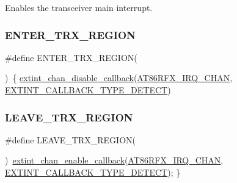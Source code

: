 Enables the transceiver main interrupt. \mbox{\label{group__samd21__xplained__pro__group_ga03364b3677b884617c15b752d8339e18}} 
\subsubsection{\texorpdfstring{ENTER\_TRX\_REGION}{ENTER\_TRX\_REGION}}
{\footnotesize\ttfamily \#define E\+N\+T\+E\+R\+\_\+\+T\+R\+X\+\_\+\+R\+E\+G\+I\+ON(\begin{DoxyParamCaption}{ }\end{DoxyParamCaption})~\{ \mbox{\hyperlink{group__asfdoc__sam0__extint__group_ga939803cc928def37adf4f22bc727e8f7}{extint\+\_\+chan\+\_\+disable\+\_\+callback}}(\mbox{\hyperlink{group__samd21__xplained__pro__group_ga59510bd28b7214b82000a06004731a8d}{A\+T86\+R\+F\+X\+\_\+\+I\+R\+Q\+\_\+\+C\+H\+AN}}, \mbox{\hyperlink{group__asfdoc__sam0__extint__group_ggaf22af5117db5d011b371b05dfa8b50e3ac2e35708fbb9eb31b2a664817f108b2d}{E\+X\+T\+I\+N\+T\+\_\+\+C\+A\+L\+L\+B\+A\+C\+K\+\_\+\+T\+Y\+P\+E\+\_\+\+D\+E\+T\+E\+CT}})}

\mbox{\label{group__samd21__xplained__pro__group_ga4d42dd2c017ace613e800d6f7e8694bc}} 
\subsubsection{\texorpdfstring{LEAVE\_TRX\_REGION}{LEAVE\_TRX\_REGION}}
{\footnotesize\ttfamily \#define L\+E\+A\+V\+E\+\_\+\+T\+R\+X\+\_\+\+R\+E\+G\+I\+ON(\begin{DoxyParamCaption}{ }\end{DoxyParamCaption})~\mbox{\hyperlink{group__asfdoc__sam0__extint__group_ga09e5568abbb3e5042b1048774a605ea4}{extint\+\_\+chan\+\_\+enable\+\_\+callback}}(\mbox{\hyperlink{group__samd21__xplained__pro__group_ga59510bd28b7214b82000a06004731a8d}{A\+T86\+R\+F\+X\+\_\+\+I\+R\+Q\+\_\+\+C\+H\+AN}}, \mbox{\hyperlink{group__asfdoc__sam0__extint__group_ggaf22af5117db5d011b371b05dfa8b50e3ac2e35708fbb9eb31b2a664817f108b2d}{E\+X\+T\+I\+N\+T\+\_\+\+C\+A\+L\+L\+B\+A\+C\+K\+\_\+\+T\+Y\+P\+E\+\_\+\+D\+E\+T\+E\+CT}}); \}}

